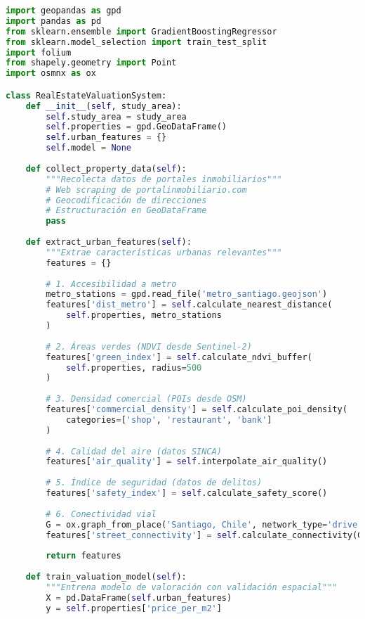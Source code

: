 \documentclass[12pt,a4paper]{article}
\begin{document}
\begin{lstlisting}[language=Python, caption=Pipeline principal del sistema]
import geopandas as gpd
import pandas as pd
from sklearn.ensemble import GradientBoostingRegressor
from sklearn.model_selection import train_test_split
import folium
from shapely.geometry import Point
import osmnx as ox

class RealEstateValuationSystem:
    def __init__(self, study_area):
        self.study_area = study_area
        self.properties = gpd.GeoDataFrame()
        self.urban_features = {}
        self.model = None
        
    def collect_property_data(self):
        """Recolecta datos de portales inmobiliarios"""
        # Web scraping de portalinmobiliario.com
        # Geocodificación de direcciones
        # Estructuración en GeoDataFrame
        pass
        
    def extract_urban_features(self):
        """Extrae características urbanas relevantes"""
        features = {}
        
        # 1. Accesibilidad a metro
        metro_stations = gpd.read_file('metro_santiago.geojson')
        features['dist_metro'] = self.calculate_nearest_distance(
            self.properties, metro_stations
        )
        
        # 2. Áreas verdes (NDVI desde Sentinel-2)
        features['green_index'] = self.calculate_ndvi_buffer(
            self.properties, radius=500
        )
        
        # 3. Densidad comercial (POIs desde OSM)
        features['commercial_density'] = self.calculate_poi_density(
            categories=['shop', 'restaurant', 'bank']
        )
        
        # 4. Calidad del aire (datos SINCA)
        features['air_quality'] = self.interpolate_air_quality()
        
        # 5. Índice de seguridad (datos de delitos)
        features['safety_index'] = self.calculate_safety_score()
        
        # 6. Conectividad vial
        G = ox.graph_from_place('Santiago, Chile', network_type='drive')
        features['street_connectivity'] = self.calculate_connectivity(G)
        
        return features
    
    def train_valuation_model(self):
        """Entrena modelo de valoración con validación espacial"""
        X = pd.DataFrame(self.urban_features)
        y = self.properties['price_per_m2']
        

\end{lstlisting}
\end{document}
